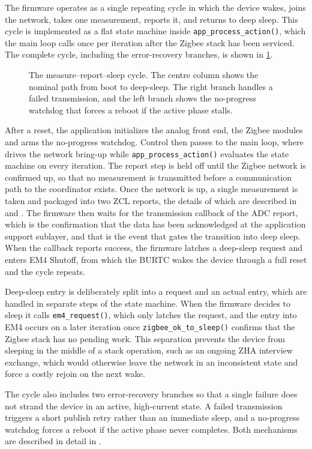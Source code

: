 The firmware operates as a single repeating cycle in which the device wakes, joins the network, takes one measurement, reports it, and returns to deep sleep.
This cycle is implemented as a flat state machine inside \texttt{app\_process\_action()}, which the main loop calls once per iteration after the Zigbee stack has been serviced.
The complete cycle, including the error-recovery branches, is shown in \cref{fig:measure_report_sleep}.

\begin{figure}
\centering

    \caption{The measure--report--sleep cycle. The centre column shows the nominal path from boot to deep-sleep. The right branch handles a failed transmission, and the left branch shows the no-progress watchdog that forces a reboot if the active phase stalls.}
    \label{fig:measure_report_sleep}
\end{figure}

After a reset, the application initializes the analog front end, the Zigbee modules and arms the no-progress watchdog.
Control then passes to the main loop, where  drives the network bring-up while \texttt{app\_process\_action()} evaluates the state machine on every iteration.
The report step is held off until the Zigbee network is confirmed up, so that no measurement is transmitted before a communication path to the coordinator exists.
Once the network is up, a single measurement is taken and packaged into two ZCL reports, the details of which are described in  and .
The firmware then waits for the transmission callback of the ADC report, which is the confirmation that the data has been acknowledged at the application support sublayer, and that is the event that gates the transition into deep sleep.
When the callback reports success, the firmware latches a deep-sleep request and enters EM4 Shutoff, from which the BURTC wakes the device through a full reset and the cycle repeats.
 
Deep-sleep entry is deliberately split into a request and an actual entry, which are handled in separate steps of the state machine.
When the firmware decides to sleep it calls \texttt{em4\_request()}, which only latches the request, and the entry into EM4 occurs on a later iteration once \texttt{zigbee\_ok\_to\_sleep()} confirms that the Zigbee stack has no pending work.
This separation prevents the device from sleeping in the middle of a stack operation, such as an ongoing ZHA interview exchange, which would otherwise leave the network in an inconsistent state and force a costly rejoin on the next wake.
 
The cycle also includes two error-recovery branches so that a single failure does not strand the device in an active, high-current state.
A failed transmission triggers a short publish retry rather than an immediate sleep, and a no-progress watchdog forces a reboot if the active phase never completes.
Both mechanisms are described in detail in .